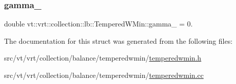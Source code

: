 \subsubsection{\texorpdfstring{gamma\+\_\+}{gamma\_}}
{\footnotesize\ttfamily double vt\+::vrt\+::collection\+::lb\+::\+Tempered\+W\+Min\+::gamma\+\_\+ = 0.\hspace{0.3cm}{\ttfamily [private]}}



The documentation for this struct was generated from the following files\+:\begin{DoxyCompactItemize}
\item 
src/vt/vrt/collection/balance/temperedwmin/\hyperlink{temperedwmin_8h}{temperedwmin.\+h}\item 
src/vt/vrt/collection/balance/temperedwmin/\hyperlink{temperedwmin_8cc}{temperedwmin.\+cc}\end{DoxyCompactItemize}
